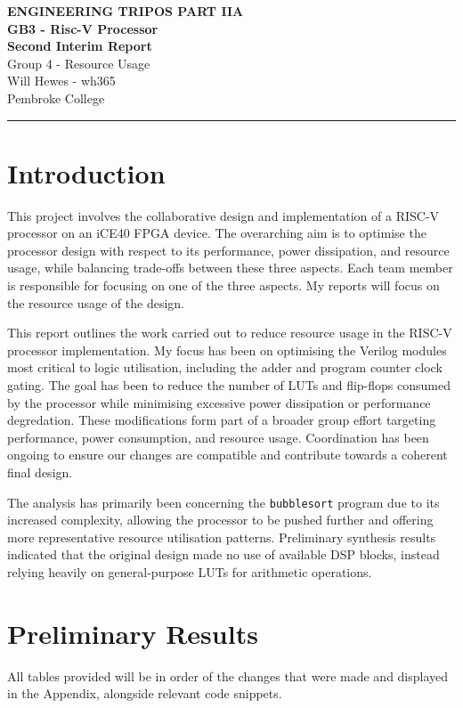 \documentclass[a4paper,10pt]{article}
\renewcommand{\maketitle}{
    \begin{center}
        \LARGE \textbf{ENGINEERING TRIPOS PART IIA} \\ 
        \vspace{0.5em}
        \Large \textbf{GB3 - Risc-V Processor} \\ 
        \vspace{0.5em}
        \textbf{Second Interim Report} \\
        \large Group 4 - Resource Usage \\
        \vspace{1em}
        \large Will Hewes - wh365 \\ 
        Pembroke College \\ 
        \vspace{0.5em}
    \end{center}
}
\begin{document}

\maketitle
\hrule
\tableofcontents
\newpage

\section{Introduction}
\label{sec:Introduction}

This project involves the collaborative design and implementation 
of a RISC-V processor on an iCE40 FPGA device. 
The overarching aim is to optimise 
the processor design with respect to its 
performance, power dissipation, and resource usage, 
while balancing trade-offs between these three aspects. 
Each team member is responsible for focusing on one of the three aspects.
My reports will focus on the resource usage of the design.

This report outlines the work carried out to reduce resource usage 
in the RISC-V processor implementation. 
My focus has been on optimising the Verilog modules 
most critical to logic utilisation, 
including the adder and program counter clock gating. 
The goal has been to reduce the number of LUTs and flip-flops consumed
by the processor while minimising 
excessive power dissipation or performance degredation.
These modifications form part of a broader group effort targeting performance, 
power consumption, and resource usage. 
Coordination has been ongoing to ensure our changes are compatible and 
contribute towards a coherent final design.

The analysis has primarily been concerning the
\texttt{bubblesort} program due to its increased complexity,
allowing the processor to be pushed further and 
offering more representative resource utilisation patterns.
Preliminary synthesis results indicated that the original design 
made no use of available DSP blocks, 
instead relying heavily on general-purpose LUTs for arithmetic operations.

\section{Preliminary Results}
\label{sec:Preliminary_Results}
All tables provided will be in order of the changes that were made
and displayed in the Appendix, alongside relevant code snippets.
\end{document}
